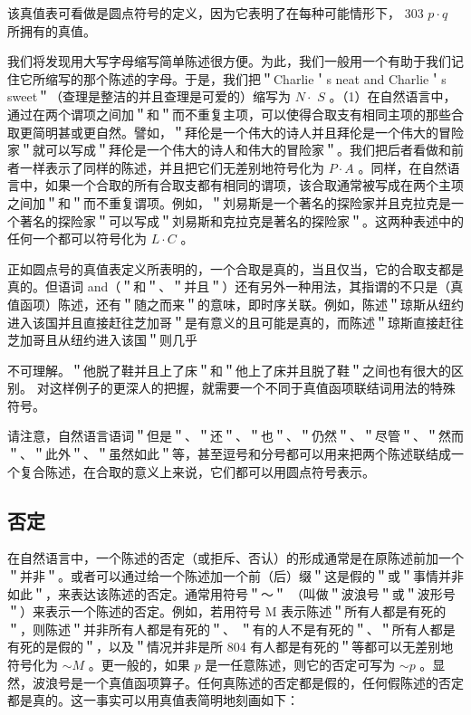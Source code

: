 该真值表可看做是圆点符号的定义，因为它表明了在每种可能情形下， 303 $p \cdot q$ 所拥有的真值。

我们将发现用大写字母缩写简单陈述很方便。为此，我们一般用一个有助于我们记住它所缩写的那个陈述的字母。于是，我们把＂Charlie＇s neat and Charlie＇s sweet＂（查理是整洁的并且查理是可爱的）缩写为 $N \cdot$ $S$ 。（1）在自然语言中，通过在两个谓项之间加＂和＂而不重复主项，可以使得合取支有相同主项的那些合取更简明甚或更自然。譬如，＂拜伦是一个伟大的诗人并且拜伦是一个伟大的冒险家＂就可以写成＂拜伦是一个伟大的诗人和伟大的冒险家＂。我们把后者看做和前者一样表示了同样的陈述，并且把它们无差别地符号化为 $P \cdot A$ 。同样，在自然语言中，如果一个合取的所有合取支都有相同的谓项，该合取通常被写成在两个主项之间加＂和＂而不重复谓项。例如，＂刘易斯是一个著名的探险家并且克拉克是一个著名的探险家＂可以写成＂刘易斯和克拉克是著名的探险家＂。这两种表述中的任何一个都可以符号化为 $L \cdot C$ 。

正如圆点号的真值表定义所表明的，一个合取是真的，当且仅当，它的合取支都是真的。但语词 and（＂和＂、＂并且＂）还有另外一种用法，其指谓的不只是（真值函项）陈述，还有＂随之而来＂的意味，即时序关联。例如，陈述＂琼斯从纽约进入该国并且直接赶往芝加哥＂是有意义的且可能是真的，而陈述＂琼斯直接赶往芝加哥且从纽约进入该国＂则几乎

不可理解。＂他脱了鞋并且上了床＂和＂他上了床并且脱了鞋＂之间也有很大的区别。\cite{grice1975} 对这样例子的更深人的把握，就需要一个不同于真值函项联结词用法的特殊符号。

请注意，自然语言语词＂但是＂、＂还＂、＂也＂、＂仍然＂、＂尽管＂、＂然而＂、＂此外＂、＂虽然如此＂等，甚至逗号和分号都可以用来把两个陈述联结成一个复合陈述，在合取的意义上来说，它们都可以用圆点符号表示。

\subsection{否定}
在自然语言中，一个陈述的否定（或拒斥、否认）的形成通常是在原陈述前加一个＂并非＂。或者可以通过给一个陈述加一个前（后）缀＂这是假的＂或＂事情并非如此＂，来表达该陈述的否定。通常用符号＂～＂ （叫做＂波浪号＂或＂波形号＂）来表示一个陈述的否定。例如，若用符号 M 表示陈述＂所有人都是有死的＂，则陈述＂并非所有人都是有死的＂、 ＂有的人不是有死的＂、＂所有人都是有死的是假的＂，以及＂情况并非是所 804 有人都是有死的＂等都可以无差别地符号化为 $\sim M$ 。更一般的，如果 $p$ 是一任意陈述，则它的否定可写为 $\sim p$ 。显然，波浪号是一个真值函项算子。任何真陈述的否定都是假的，任何假陈述的否定都是真的。这一事实可以用真值表简明地刻画如下：

